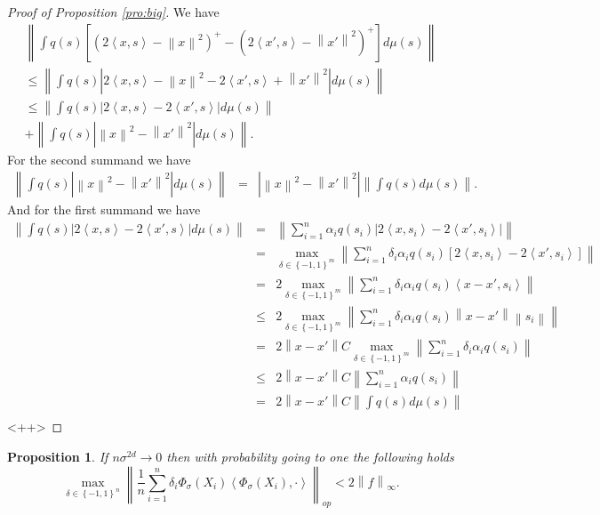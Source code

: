 \documentclass{article} %
\def\fm{{\Phi_\sigma}} %
\def\l{\left}
\def\r{\right}
\newtheorem{prop}{Proposition}
\theoremstyle{definition}
\begin{document}
\begin{proof}[Proof of Proposition \ref{pro:big}]
    We have
    \begin{eqnarray*}
        \l\| \int q(s) \l[\left(2 \l<x,s\r> - \l\|x\r\|^2  \right)^+ - \left( 2\l<x',s\r> - \l\|x'\r\|^2 \right)^+ \r] d\mu(s) \r\|\\
        \le \l\| \int q(s) \l|2 \l<x,s\r> - \l\|x\r\|^2  -  2\l<x',s\r> + \l\|x'\r\|^2 \r| d\mu(s) \r\|\\
        \le \l\| \int q(s) \l|2 \l<x,s\r> -  2\l<x',s\r> \r| d\mu(s) \r\|\\
        + \l\| \int q(s) \l|  \l\|x\r\|^2  - \l\|x'\r\|^2 \r| d\mu(s) \r\|.
    \end{eqnarray*}
    For the second summand we have
    \begin{eqnarray*}
        \l\| \int q(s) \l|  \l\|x\r\|^2  - \l\|x'\r\|^2 \r| d\mu(s) \r\|
        &=&\l|  \l\|x\r\|^2  - \l\|x'\r\|^2 \r|\l\| \int q(s)  d\mu(s) \r\|.
    \end{eqnarray*}
    And for the first summand we have
    \begin{eqnarray*}
         \l\| \int q(s) \l|2 \l<x,s\r> -  2\l<x',s\r> \r| d\mu(s) \r\|
         &=& \l\| \sum_{i=1}^n \alpha_i q(s_i) \l|2 \l<x,s_i\r> -  2\l<x',s_i\r> \r|  \r\|\\
         &=& \max_{\delta \in \left\{ -1,1 \right\}^m} \l\| \sum_{i=1}^n \delta_i \alpha_i q(s_i) \l[2 \l<x,s_i\r> -  2\l<x',s_i\r> \r]\r\| \\
         &=& 2\max_{\delta \in \left\{ -1,1 \right\}^m} \l\| \sum_{i=1}^n \delta_i \alpha_i q(s_i)  \l<x- x',s_i\r> \r\| \\
         &\le& 2\max_{\delta \in \left\{ -1,1 \right\}^m} \l\| \sum_{i=1}^n \delta_i \alpha_i q(s_i)  \l\|x- x'\r\|\l\|s_i\r\| \r\| \\
         &=& 2\l\|x- x'\r\|C\max_{\delta \in \left\{ -1,1 \right\}^m} \l\| \sum_{i=1}^n \delta_i \alpha_i q(s_i)   \r\| \\
         &\le& 2\l\|x- x'\r\|C \l\| \sum_{i=1}^n  \alpha_i q(s_i)   \r\| \\
         &=& 2\l\|x- x'\r\|C \l\| \int q(s) d\mu(s)   \r\| \\
    \end{eqnarray*}<++>
\end{proof}
\begin{prop}\label{pro:tens}
    If $n\sigma^{2d} \to 0$ then with probability going to one the following holds
    \begin{equation*}
        \max_{\delta\in \left\{ -1,1 \right\}^ n} \l\| \frac{1}{n}\sum_{i=1}^n \delta_i \fm(X_i)\l<\fm(X_i),\cdot\r>\r\|_{op} < 2\l\|f\r\|_\infty.
    \end{equation*}
\end{prop}
\end{document}
